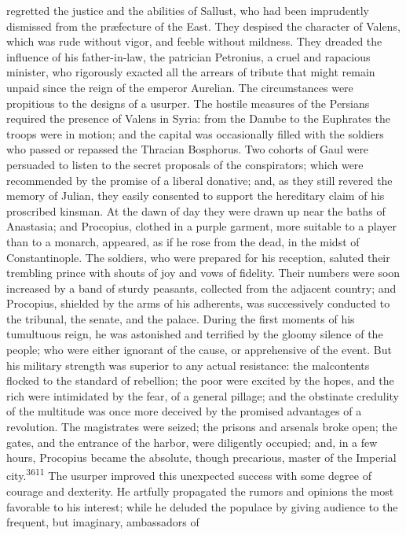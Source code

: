 {{{{{{{{{{{{{{{{{{{{{{{{{{{{{{{{{{{{regretted the justice and the abilities of Sallust, who had been
imprudently dismissed from the præfecture of the East. They
despised the character of Valens, which was rude without vigor,
and feeble without mildness. They dreaded the influence of his
father-in-law, the patrician Petronius, a cruel and rapacious
minister, who rigorously exacted all the arrears of tribute that
might remain unpaid since the reign of the emperor Aurelian. The
circumstances were propitious to the designs of a usurper. The
hostile measures of the Persians required the presence of Valens
in Syria: from the Danube to the Euphrates the troops were in
motion; and the capital was occasionally filled with the soldiers
who passed or repassed the Thracian Bosphorus. Two cohorts of
Gaul were persuaded to listen to the secret proposals of the
conspirators; which were recommended by the promise of a liberal
donative; and, as they still revered the memory of Julian, they
easily consented to support the hereditary claim of his
proscribed kinsman. At the dawn of day they were drawn up near
the baths of Anastasia; and Procopius, clothed in a purple
garment, more suitable to a player than to a monarch, appeared,
as if he rose from the dead, in the midst of Constantinople. The
soldiers, who were prepared for his reception, saluted their
trembling prince with shouts of joy and vows of fidelity. Their
numbers were soon increased by a band of sturdy peasants,
collected from the adjacent country; and Procopius, shielded by
the arms of his adherents, was successively conducted to the
tribunal, the senate, and the palace. During the first moments of
his tumultuous reign, he was astonished and terrified by the
gloomy silence of the people; who were either ignorant of the
cause, or apprehensive of the event. But his military strength
was superior to any actual resistance: the malcontents flocked to
the standard of rebellion; the poor were excited by the hopes,
and the rich were intimidated by the fear, of a general pillage;
and the obstinate credulity of the multitude was once more
deceived by the promised advantages of a revolution. The
magistrates were seized; the prisons and arsenals broke open; the
gates, and the entrance of the harbor, were diligently occupied;
and, in a few hours, Procopius became the absolute, though
precarious, master of the Imperial city.\textsuperscript{3611} The usurper
improved this unexpected success with some degree of courage and
dexterity. He artfully propagated the rumors and opinions the
most favorable to his interest; while he deluded the populace by
giving audience to the frequent, but imaginary, ambassadors of
}}}}}}}}}}}}}}}}}}}}}}}}}}}}}}}}}}}}
